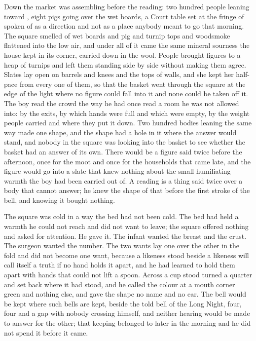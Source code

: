 Down  the market was assembling before the reading: two hundred people leaning toward , eight pigs going over the wet boards, a Court table set at the fringe of  spoken of as a direction and not as a place anybody meant to go that morning. The square smelled of wet boards and pig and turnip tops and woodsmoke flattened into the low air, and under all of it came the same mineral sourness the house kept in its corner, carried down in the wool. People brought figures to a heap of turnips and left them standing side by side without making them agree. Slates lay open on barrels and knees and the tops of walls, and she kept her half-pace from every one of them, so that the basket went through the square at the edge of the light where no figure could fall into it and none could be taken off it. The boy read the crowd the way he had once read a room he was not allowed into: by the exits, by which hands were full and which were empty, by the weight people carried and where they put it down. Two hundred bodies leaning the same way made one shape, and the shape had a hole in it where the answer would stand, and nobody in the square was looking into the basket to see whether the basket had an answer of its own. There would be a figure said twice before the afternoon, once for the moot and once for the households that came late, and the figure would go into a slate that knew nothing about the small humiliating warmth the boy had been carried out of. A reading is a thing said twice over a body that cannot answer; he knew the shape of that before the first stroke of the bell, and knowing it bought nothing.

The square was cold in a way the bed had not been cold. The bed had held a warmth he could not reach and did not want to leave; the square offered nothing and asked for attention. He gave it. The infant wanted the breast and the crust. The surgeon wanted the number. The two wants lay one over the other in the fold and did not become one want, because a likeness stood beside a likeness will call itself a truth if no hand holds it apart, and he had learned to hold them apart with hands that could not lift a spoon. Across  a cup stood turned a quarter and set back where it had stood, and he called the colour at a mouth corner green and nothing else, and gave the shape no name and no ear. The bell would be kept where such bells are kept, beside the told bell of the Long Night, four, four and a gap with nobody crossing himself, and neither hearing would be made to answer for the other; that keeping belonged to later in the morning and he did not spend it before it came.

